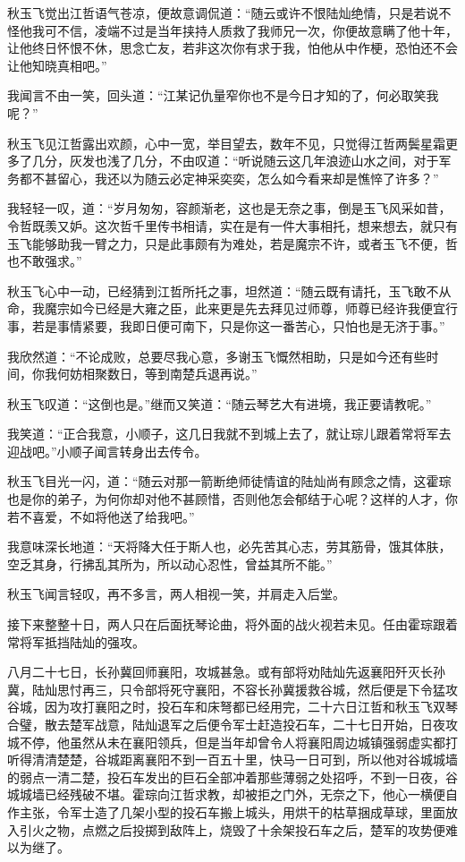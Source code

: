 秋玉飞觉出江哲语气苍凉，便故意调侃道：“随云或许不恨陆灿绝情，只是若说不怪他我可不信，凌端不过是当年挟持人质救了我师兄一次，你便故意瞒了他十年，让他终日怀恨不休，思念亡友，若非这次你有求于我，怕他从中作梗，恐怕还不会让他知晓真相吧。”

我闻言不由一笑，回头道：“江某记仇量窄你也不是今日才知的了，何必取笑我呢？”

秋玉飞见江哲露出欢颜，心中一宽，举目望去，数年不见，只觉得江哲两鬓星霜更多了几分，灰发也浅了几分，不由叹道：“听说随云这几年浪迹山水之间，对于军务都不甚留心，我还以为随云必定神采奕奕，怎么如今看来却是憔悴了许多？”

我轻轻一叹，道：“岁月匆匆，容颜渐老，这也是无奈之事，倒是玉飞风采如昔，令哲既羡又妒。这次哲千里传书相请，实在是有一件大事相托，想来想去，就只有玉飞能够助我一臂之力，只是此事颇有为难处，若是魔宗不许，或者玉飞不便，哲也不敢强求。”

秋玉飞心中一动，已经猜到江哲所托之事，坦然道：“随云既有请托，玉飞敢不从命，我魔宗如今已经是大雍之臣，此来更是先去拜见过师尊，师尊已经许我便宜行事，若是事情紧要，我即日便可南下，只是你这一番苦心，只怕也是无济于事。”

我欣然道：“不论成败，总要尽我心意，多谢玉飞慨然相助，只是如今还有些时间，你我何妨相聚数日，等到南楚兵退再说。”

秋玉飞叹道：“这倒也是。”继而又笑道：“随云琴艺大有进境，我正要请教呢。”

我笑道：“正合我意，小顺子，这几日我就不到城上去了，就让琮儿跟着常将军去迎战吧。”小顺子闻言转身出去传令。

秋玉飞目光一闪，道：“随云对那一箭断绝师徒情谊的陆灿尚有顾念之情，这霍琮也是你的弟子，为何你却对他不甚顾惜，否则他怎会郁结于心呢？这样的人才，你若不喜爱，不如将他送了给我吧。”

我意味深长地道：“天将降大任于斯人也，必先苦其心志，劳其筋骨，饿其体肤，空乏其身，行拂乱其所为，所以动心忍性，曾益其所不能。”

秋玉飞闻言轻叹，再不多言，两人相视一笑，并肩走入后堂。

接下来整整十日，两人只在后面抚琴论曲，将外面的战火视若未见。任由霍琮跟着常将军抵挡陆灿的强攻。

八月二十七日，长孙冀回师襄阳，攻城甚急。或有部将劝陆灿先返襄阳歼灭长孙冀，陆灿思忖再三，只令部将死守襄阳，不容长孙冀援救谷城，然后便是下令猛攻谷城，因为攻打襄阳之时，投石车和床弩都已经用完，二十六日江哲和秋玉飞双琴合璧，散去楚军战意，陆灿退军之后便令军士赶造投石车，二十七日开始，日夜攻城不停，他虽然从未在襄阳领兵，但是当年却曾令人将襄阳周边城镇强弱虚实都打听得清清楚楚，谷城距离襄阳不到一百五十里，快马一日可到，所以他对谷城城墙的弱点一清二楚，投石车发出的巨石全部冲着那些薄弱之处招呼，不到一日夜，谷城城墙已经残破不堪。霍琮向江哲求教，却被拒之门外，无奈之下，他心一横便自作主张，令军士造了几架小型的投石车搬上城头，用烘干的枯草捆成草球，里面放入引火之物，点燃之后投掷到敌阵上，烧毁了十余架投石车之后，楚军的攻势便难以为继了。


